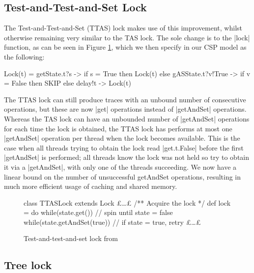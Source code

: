 \subsection{Test-and-Test-and-Set Lock}

The Test-and-Test-and-Set (TTAS) lock makes use of this improvement, whilst otherwise remaining very similar to the TAS lock. The sole change is to the |lock| function, as can be seen in Figure \ref{scala:TTAS}, which we then specify in our CSP model as the following: 
\begin{cspm}
  Lock(t) =  getState.t?s -> if s = True then Lock(t)
                             else gASState.t?v!True -> if v = False then SKIP
                             else delay!t -> Lock(t)
\end{cspm}
The TTAS lock can still produce traces with an unbound number of consecutive operations, but these are now |get| operations instead of |getAndSet| operations. Whereas the TAS lock can have an unbounded number of |getAndSet| operations for each time the lock is obtained, the TTAS lock has performs at most one |getAndSet| operation per thread when the lock becomes available. This is the case when all threads trying to obtain the lock read |get.t.False| before the first |getAndSet| is performed; all threads know the lock was not held so try to obtain it via a |getAndSet|, with only one of the threads succeeding. We now have a linear bound on the number of unsuccessful getAndSet operations, resulting in much more efficient usage of caching and shared memory.

\begin{figure}
  \begin{scala}
    class TTASLock extends Lock{ 
      £\dots£
      /** Acquire the lock */
      def lock = 
        do{
          while(state.get()){ } // spin until state = false
        } while(state.getAndSet(true)) // if state = true, retry
      £\dots£
    }
  \end{scala}
  \caption{Test-and-test-and-set lock from \cite{CADS}  \label{scala:TTAS}}
\end{figure}

\subsection{Tree lock}


